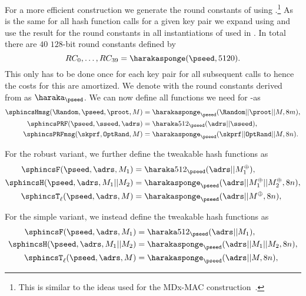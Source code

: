    For a more efficient construction we generate the round constants of
   \haraka using \pseed.\footnote{This is similar to the ideas used for the
   MDx-MAC construction~\cite{DBLP:conf/crypto/PrenelO95}.} As \pseed is the
   same for all hash function calls for a given key pair we expand \pseed
   using \harakasponge and use the result for the round constants in all
   instantiations of \haraka used in \spx. In total there are $40$ $128$-bit
   round constants defined by
   \begin{equation}
      RC_0,\ldots,RC_{39} = \harakasponge(\pseed, 5120).
   \end{equation}
   This only has to be done once for each key pair for all subsequent calls
   to \haraka hence the costs for this are amortized. We denote \haraka with
   the round constants derived from \pseed as $\haraka_{\pseed}$. We can now define
   all functions we need for \spx-\haraka as
   \begin{equation}
   \begin{aligned}
      \sphincsHmsg(\Random,\pseed, \proot, M) &= \harakasponge_{\pseed}(\Random || \proot || M, 8m),\\
      \sphincsPRF(\pseed, \sseed, \adrs) &= \haraka512_{\pseed}(\adrs || \sseed),\\
      \sphincsPRFmsg(\skprf, \texttt{OptRand}, M) &= \harakasponge_{\pseed}(\skprf || \texttt{OptRand} || M, 8n).\\
   \end{aligned}
   \end{equation}

   For the robust variant, we further define the tweakable hash functions as
   \begin{equation}
   \begin{aligned}
      \sphincsF(\pseed, \adrs, M_1) &= \haraka512_{\pseed}(\adrs || M_1^{\oplus}),\\
      \sphincsH(\pseed, \adrs, M_1 || M_2) &=  \harakasponge_{\pseed}(\adrs ||
                                           M_1^{\oplus} || M_2^{\oplus}, 8n),\\
      \sphincsT_\ell(\pseed, \adrs, M) &=  \harakasponge_{\pseed}(\adrs || M^{\oplus}, 8n),\\
   \end{aligned}
   \end{equation}

   For the simple variant, we instead define the tweakable hash functions as
   \begin{equation}
   \begin{aligned}
      \sphincsF(\pseed, \adrs, M_1) &= \haraka512_{\pseed}(\adrs || M_1),\\
      \sphincsH(\pseed, \adrs, M_1 || M_2) &=  \harakasponge_{\pseed}(\adrs ||
                                           M_1 || M_2, 8n),\\
      \sphincsT_\ell(\pseed, \adrs, M) &=  \harakasponge_{\pseed}(\adrs || M, 8n),\\
   \end{aligned}
   \end{equation}

